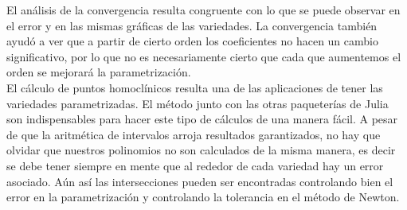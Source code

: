 El análisis de la convergencia resulta congruente con lo que se puede observar en el error y en las mismas gráficas de las variedades. La convergencia también ayudó a ver que a partir de cierto orden los coeficientes no hacen un cambio significativo, por lo que no es necesariamente cierto que cada que aumentemos el orden se mejorará la parametrización.\\


El cálculo de puntos homoclínicos resulta una de las aplicaciones de tener las variedades parametrizadas. El método junto con las otras paqueterías de Julia son indispensables para hacer este tipo de cálculos de una manera fácil. A pesar de que la aritmética de intervalos arroja resultados garantizados, no hay que olvidar que nuestros polinomios no son calculados de la misma manera, es decir se debe tener siempre en mente que al rededor de cada variedad hay un error asociado. Aún así las intersecciones pueden ser encontradas controlando bien el error en la parametrización y controlando la tolerancia en el método de Newton.






